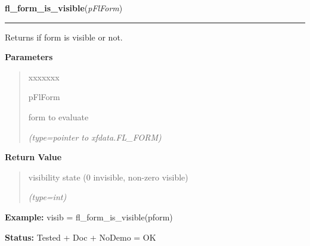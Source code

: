 \hspace{.8\funcindent}\begin{boxedminipage}{\funcwidth}

    \raggedright \textbf{fl\_form\_is\_visible}(\textit{pFlForm})

    \vspace{-1.5ex}

    \rule{\textwidth}{0.5\fboxrule}
\setlength{\parskip}{2ex}
    Returns if form is visible or not.

\setlength{\parskip}{1ex}
      \textbf{Parameters}
      \vspace{-1ex}

      \begin{quote}
        \begin{Ventry}{xxxxxxx}

          \item[pFlForm]

          form to evaluate

            {\it (type=pointer to xfdata.FL\_FORM)}

        \end{Ventry}

      \end{quote}

      \textbf{Return Value}
    \vspace{-1ex}

      \begin{quote}
      visibility state (0 invisible, non-zero visible)

      {\it (type=int)}

      \end{quote}

\textbf{Example:} visib = fl\_form\_is\_visible(pform)



\textbf{Status:} Tested + Doc + NoDemo = OK



    \end{boxedminipage}

    \label{xformslib:flbasic:fl_form_is_iconified}

    \vspace{0.5ex}

